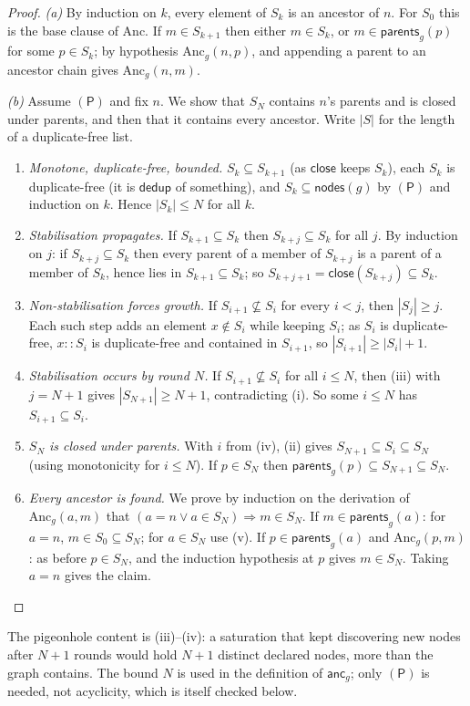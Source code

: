 \begin{proof}
\emph{(a)} By induction on $k$, every element of $S_k$ is an ancestor of $n$. For $S_0$ this is the base clause of $\mathrm{Anc}$. If $m \in S_{k+1}$ then either $m \in S_k$, or $m \in \mathsf{parents}_g(p)$ for some $p \in S_k$; by hypothesis $\mathrm{Anc}_g(n,p)$, and appending a parent to an ancestor chain gives $\mathrm{Anc}_g(n,m)$.

\emph{(b)} Assume $(\mathsf{P})$ and fix $n$. We show that $S_N$ contains $n$'s parents and is closed under parents, and then that it contains every ancestor. Write $|S|$ for the length of a duplicate-free list.
\begin{enumerate}
\item[(i)] \emph{Monotone, duplicate-free, bounded.} $S_k \subseteq S_{k+1}$ (as $\mathsf{close}$ keeps $S_k$), each $S_k$ is duplicate-free (it is $\mathsf{dedup}$ of something), and $S_k \subseteq \mathsf{nodes}(g)$ by $(\mathsf{P})$ and induction on $k$. Hence $|S_k| \le N$ for all $k$.
\item[(ii)] \emph{Stabilisation propagates.} If $S_{k+1} \subseteq S_k$ then $S_{k+j} \subseteq S_k$ for all $j$. By induction on $j$: if $S_{k+j} \subseteq S_k$ then every parent of a member of $S_{k+j}$ is a parent of a member of $S_k$, hence lies in $S_{k+1} \subseteq S_k$; so $S_{k+j+1} = \mathsf{close}(S_{k+j}) \subseteq S_k$.
\item[(iii)] \emph{Non-stabilisation forces growth.} If $S_{i+1} \not\subseteq S_i$ for every $i < j$, then $|S_j| \ge j$. Each such step adds an element $x \notin S_i$ while keeping $S_i$; as $S_i$ is duplicate-free, $x :: S_i$ is duplicate-free and contained in $S_{i+1}$, so $|S_{i+1}| \ge |S_i| + 1$.
\item[(iv)] \emph{Stabilisation occurs by round $N$.} If $S_{i+1} \not\subseteq S_i$ for all $i \le N$, then (iii) with $j = N+1$ gives $|S_{N+1}| \ge N+1$, contradicting (i). So some $i \le N$ has $S_{i+1} \subseteq S_i$.
\item[(v)] \emph{$S_N$ is closed under parents.} With $i$ from (iv), (ii) gives $S_{N+1} \subseteq S_i \subseteq S_N$ (using monotonicity for $i \le N$). If $p \in S_N$ then $\mathsf{parents}_g(p) \subseteq S_{N+1} \subseteq S_N$.
\item[(vi)] \emph{Every ancestor is found.} We prove by induction on the derivation of $\mathrm{Anc}_g(a,m)$ that $(a = n \lor a \in S_N) \Rightarrow m \in S_N$. If $m \in \mathsf{parents}_g(a)$: for $a = n$, $m \in S_0 \subseteq S_N$; for $a \in S_N$ use (v). If $p \in \mathsf{parents}_g(a)$ and $\mathrm{Anc}_g(p,m)$: as before $p \in S_N$, and the induction hypothesis at $p$ gives $m \in S_N$. Taking $a = n$ gives the claim.\qedhere
\end{enumerate}
\end{proof}
The pigeonhole content is (iii)--(iv): a saturation that kept discovering new nodes after $N+1$ rounds would hold $N+1$ distinct declared nodes, more than the graph contains. The bound $N$ is used in the definition of $\mathsf{anc}_g$; only $(\mathsf{P})$ is needed, not acyclicity, which is itself checked below.

